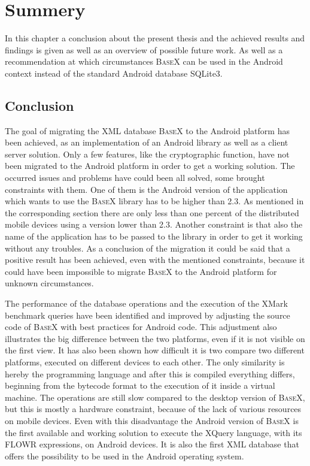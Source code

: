 \chapter{Summery}
\label{cha:summery}
In this chapter a conclusion about the present thesis and the achieved results and findings is given as well as an overview of possible future work.
As well as a recommendation at which circumstances \textsc{BaseX} can be used in the Android context instead of the standard Android database SQLite3.
\section{Conclusion}
\label{sec:summery:conclusion}
The goal of migrating the XML database \textsc{BaseX} to the Android platform has been achieved, as an implementation of an Android library as well as a client server solution.
Only a few features, like the cryptographic function, have not been migrated to the Android platform in order to get a working solution.
The occurred issues and problems have could been all solved, some brought constraints with them.
One of them is the Android version of the application which wants to use the \textsc{BaseX} library has to be higher than 2.3.
As mentioned in the corresponding section there are only less than one percent of the distributed mobile devices using a version lower than 2.3.
Another constraint is that also the name of the application has to be passed to the library in order to get it working without any troubles.
As a conclusion of the migration it could be said that a positive result has been achieved, even with the mentioned constraints, because it could have been impossible to migrate \textsc{BaseX} to the Android platform for unknown circumstances.





The performance of the database operations and the execution of the XMark benchmark queries have been identified and improved by adjusting the source code of \textsc{BaseX} with best practices for Android code.
This adjustment also illustrates the big difference between the two platforms, even if it is not visible on the first view.
It has also been shown how difficult it is two compare two different platforms, executed on different devices to each other.
The only similarity is hereby the programming language and after this is compiled everything differs, beginning from the bytecode format to the execution of it inside a virtual machine.
The operations are still slow compared to the desktop version of \textsc{BaseX}, but this is mostly a hardware constraint, because of the lack of various resources on mobile devices.
Even with this disadvantage the Android version of \textsc{BaseX} is the first available and working solution to execute the XQuery language, with its FLOWR expressions, on Android devices.
It is also the first XML database that offers the possibility to be used in the Android operating system.


